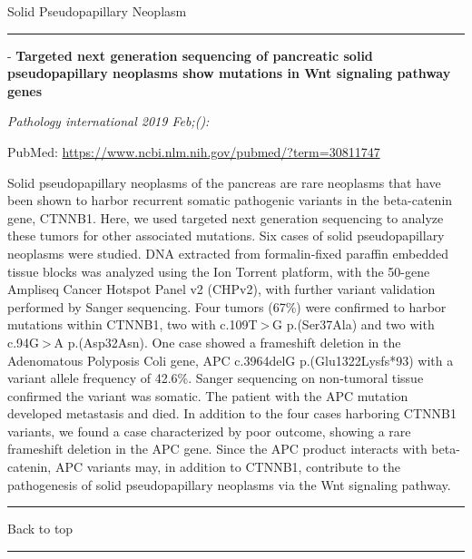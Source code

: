 \documentclass[]{article}
\begin{document}
Solid Pseudopapillary Neoplasm

\begin{center}\rule{0.5\linewidth}{\linethickness}\end{center}

 - \textbf{Targeted next generation sequencing of pancreatic solid
pseudopapillary neoplasms show mutations in Wnt signaling pathway genes}

\emph{Pathology international 2019 Feb;():}

PubMed: \url{https://www.ncbi.nlm.nih.gov/pubmed/?term=30811747}

Solid pseudopapillary neoplasms of the pancreas are rare neoplasms that
have been shown to harbor recurrent somatic pathogenic variants in the
beta-catenin gene, CTNNB1. Here, we used targeted next generation
sequencing to analyze these tumors for other associated mutations. Six
cases of solid pseudopapillary neoplasms were studied. DNA extracted
from formalin-fixed paraffin embedded tissue blocks was analyzed using
the Ion Torrent platform, with the 50-gene Ampliseq Cancer Hotspot Panel
v2 (CHPv2), with further variant validation performed by Sanger
sequencing. Four tumors (67\%) were confirmed to harbor mutations within
CTNNB1, two with c.109T \textgreater{} G p.(Ser37Ala) and two with
c.94G \textgreater{} A p.(Asp32Asn). One case showed a frameshift
deletion in the Adenomatous Polyposis Coli gene, APC c.3964delG
p.(Glu1322Lysfs*93) with a variant allele frequency of 42.6\%. Sanger
sequencing on non-tumoral tissue confirmed the variant was somatic. The
patient with the APC mutation developed metastasis and died. In addition
to the four cases harboring CTNNB1 variants, we found a case
characterized by poor outcome, showing a rare frameshift deletion in the
APC gene. Since the APC product interacts with beta-catenin, APC
variants may, in addition to CTNNB1, contribute to the pathogenesis of
solid pseudopapillary neoplasms via the Wnt signaling pathway.

{}

{}

\begin{center}\rule{0.5\linewidth}{\linethickness}\end{center}

Back to top

\begin{center}\rule{0.5\linewidth}{\linethickness}\end{center}

\pagebreak
\end{document}
